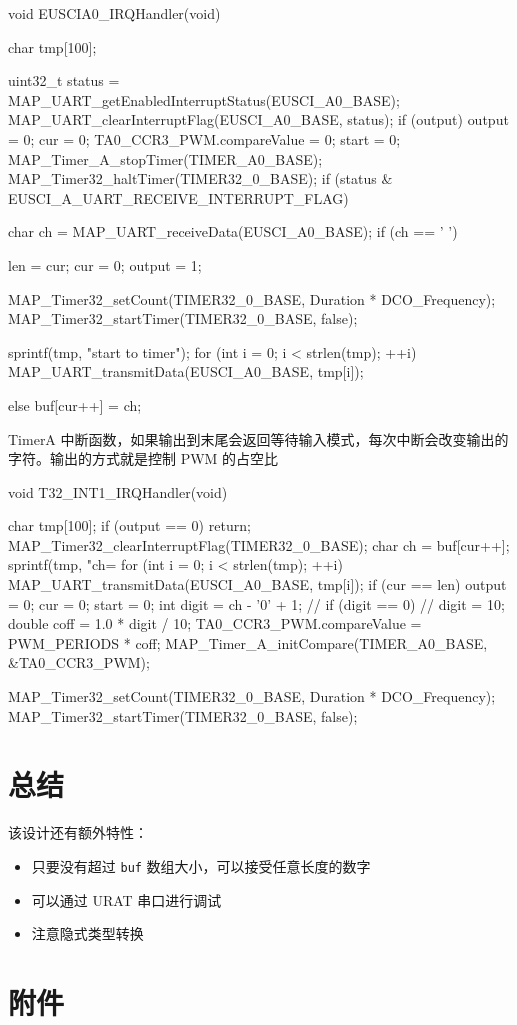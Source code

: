 \documentclass[a4paper,10pt,UTF8]{paper}
\numberwithin{equation}{section}
\numberwithin{figure}{section}
\begin{document}
\begin{ccode}
    void EUSCIA0_IRQHandler(void)
    {
        char tmp[100];
                        
        uint32_t status = MAP_UART_getEnabledInterruptStatus(EUSCI_A0_BASE);
        MAP_UART_clearInterruptFlag(EUSCI_A0_BASE, status);
        if (output)
        {
            output = 0;
            cur = 0;
            TA0_CCR3_PWM.compareValue = 0;
            start = 0;
            MAP_Timer_A_stopTimer(TIMER_A0_BASE);
            MAP_Timer32_haltTimer(TIMER32_0_BASE);
        }
        if (status & EUSCI_A_UART_RECEIVE_INTERRUPT_FLAG)
        {
            char ch = MAP_UART_receiveData(EUSCI_A0_BASE);
            if (ch == ' ')
            {
                len = cur;
                cur = 0;
                output = 1;
                                                
                MAP_Timer32_setCount(TIMER32_0_BASE, Duration * DCO_Frequency);
                MAP_Timer32_startTimer(TIMER32_0_BASE, false);
                                                
                sprintf(tmp, "start to timer\n");
                for (int i = 0; i < strlen(tmp); ++i)
                {
                    MAP_UART_transmitData(EUSCI_A0_BASE, tmp[i]);
                }
            }
            else
            {
                buf[cur++] = ch;
            }
        }
    }
\end{ccode}

TimerA 中断函数，如果输出到末尾会返回等待输入模式，每次中断会改变输出的字符。输出的方式就是控制 PWM 的占空比

\begin{ccode}
    void T32_INT1_IRQHandler(void)
    {
        char tmp[100];
        if (output == 0) return;
        MAP_Timer32_clearInterruptFlag(TIMER32_0_BASE);
        char ch = buf[cur++];
        sprintf(tmp, "ch=%
        for (int i = 0; i < strlen(tmp); ++i)
        {
            MAP_UART_transmitData(EUSCI_A0_BASE, tmp[i]);
        }
        if (cur == len)
        {
            output = 0;
            cur = 0;
            start = 0;
        }
        int digit = ch - '0' + 1;
        // if (digit == 0)
        //   digit = 10;
        double coff = 1.0 * digit / 10;
        TA0_CCR3_PWM.compareValue = PWM_PERIODS * coff;
        MAP_Timer_A_initCompare(TIMER_A0_BASE, &TA0_CCR3_PWM);
                
        MAP_Timer32_setCount(TIMER32_0_BASE, Duration * DCO_Frequency);
        MAP_Timer32_startTimer(TIMER32_0_BASE, false);
    }
\end{ccode}
\section{总结}

该设计还有额外特性：

\begin{itemize}
    \item 只要没有超过 \texttt{buf} 数组大小，可以接受任意长度的数字
    \item 可以通过 URAT 串口进行调试
    \item 注意隐式类型转换
\end{itemize}
    

\section{附件}
\end{document}
